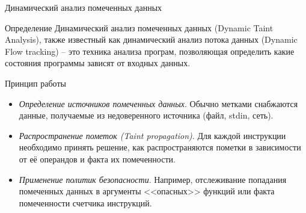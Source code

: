 \documentclass[10pt]{beamer}
\begin{document}
\begin{frame}{Динамический анализ помеченных данных}
  \begin{block}{Определение}
    Динамический анализ помеченных данных (Dynamic Taint Analysis), также известный как динамический анализ потока данных (Dynamic Flow tracking) -- это техника анализа програм, позволяющая определить какие состояния программы зависят от входных данных.
  \end{block}
  \begin{block}{Принцип работы}
    \begin{itemize}
        \item {\em Определение источников помеченных данных}. Обычно метками снабжаются данные, получаемые из недоверенного источника (файл, stdin, сеть).
        \item {\em Распространение пометок (Taint propagation)}. Для каждой инструкции необходимо принять решение, как распространяются пометки в зависимости от её операндов и факта их помеченности.
        \item {\em Применение политик безопасности}. Например, отслеживание попадания помеченных данных в аргументы <<опасных>> функций или факта помеченности счетчика инструкций.
    \end{itemize}
  \end{block}
\end{frame}
\end{document}
